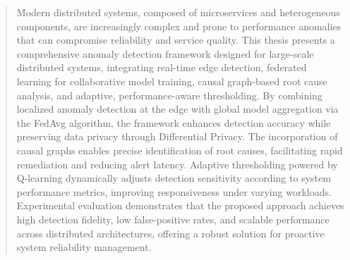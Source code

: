 \documentclass[12pt,a4paper]{report}
\begin{document}
\clearpage

\begin{abstract}
\noindent
Modern distributed systems, composed of microservices and heterogeneous
components, are increasingly complex and prone to performance anomalies that can
compromise reliability and service quality. This thesis presents a comprehensive
anomaly detection framework designed for large-scale distributed systems,
integrating real-time edge detection, federated learning for collaborative model
training, causal graph-based root cause analysis, and adaptive,
performance-aware thresholding. By combining localized anomaly detection at the
edge with global model aggregation via the FedAvg algorithm, the framework
enhances detection accuracy while preserving data privacy through Differential
Privacy. The incorporation of causal graphs enables precise identification of
root causes, facilitating rapid remediation and reducing alert latency. Adaptive
thresholding powered by Q-learning dynamically adjusts detection sensitivity
according to system performance metrics, improving responsiveness under varying
workloads. Experimental evaluation demonstrates that the proposed approach
achieves high detection fidelity, low false-positive rates, and scalable
performance across distributed architectures, offering a robust solution for
proactive system reliability management.
\end{abstract}

\clearpage

\tableofcontents
\clearpage
\listoffigures
\clearpage
\listoftables
\clearpage














\printbibliography[heading=bibintoc, title={References}]
\end{document}
